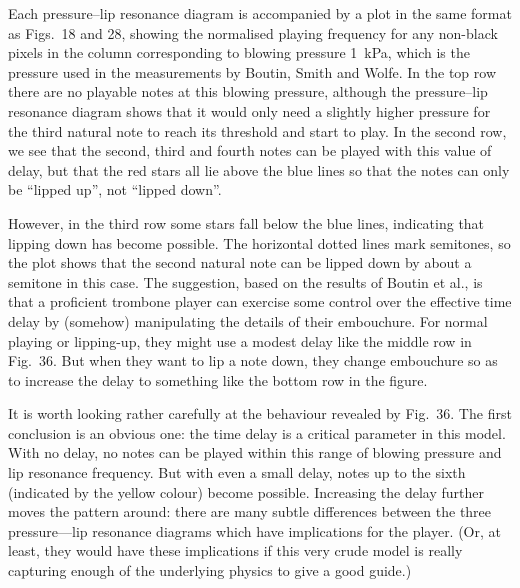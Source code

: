 





  Each pressure--lip resonance diagram is accompanied by a plot in the same 
  format as Figs.\ 18 and 28, showing the normalised playing frequency for any 
  non-black pixels in the column corresponding to blowing pressure 1~kPa, which 
  is the pressure used in the measurements by Boutin, Smith and Wolfe. In the 
  top row there are no playable notes at this blowing pressure, although the 
  pressure--lip resonance diagram shows that it would only need a slightly 
  higher pressure for the third natural note to reach its threshold and start 
  to play. In the second row, we see that the second, third and fourth notes 
  can be played with this value of delay, but that the red stars all lie above 
  the blue lines so that the notes can only be “lipped up”, not “lipped down”. 

  However, in the third row some stars fall below the blue lines, indicating 
  that lipping down has become possible. The horizontal dotted lines mark 
  semitones, so the plot shows that the second natural note can be lipped down 
  by about a semitone in this case. The suggestion, based on the results of 
  Boutin et al., is that a proficient trombone player can exercise some control 
  over the effective time delay by (somehow) manipulating the details of their 
  embouchure. For normal playing or lipping-up, they might use a modest delay 
  like the middle row in Fig.\ 36. But when they want to lip a note down, they 
  change embouchure so as to increase the delay to something like the bottom 
  row in the figure. 

  It is worth looking rather carefully at the behaviour revealed by Fig.\ 36. 
  The first conclusion is an obvious one: the time delay is a critical 
  parameter in this model. With no delay, no notes can be played within this 
  range of blowing pressure and lip resonance frequency. But with even a small 
  delay, notes up to the sixth (indicated by the yellow colour) become 
  possible. Increasing the delay further moves the pattern around: there are 
  many subtle differences between the three pressure—lip resonance diagrams 
  which have implications for the player. (Or, at least, they would have these 
  implications if this very crude model is really capturing enough of the 
  underlying physics to give a good guide.) 

